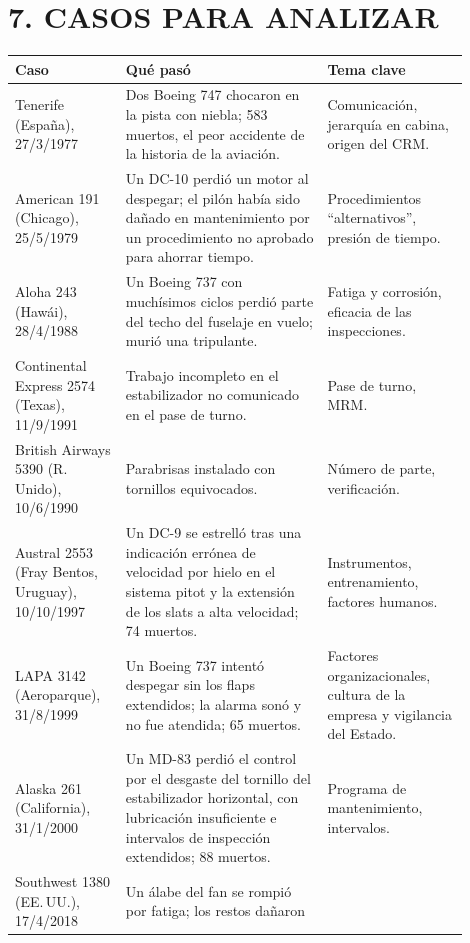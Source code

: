 \section*{7. CASOS PARA ANALIZAR}

\begin{center}
\footnotesize
\begin{tabular}{|p{0.22\linewidth}|p{0.40\linewidth}|p{0.28\linewidth}|}
\hline
\textbf{Caso} & \textbf{Qué pasó} & \textbf{Tema clave} \\ \hline
Tenerife (España), 27/3/1977 & Dos Boeing 747 chocaron en la pista con niebla; 583 muertos, el
peor accidente de la historia de la aviación. & Comunicación, jerarquía en cabina, origen del
CRM. \\ \hline
American 191 (Chicago), 25/5/1979 & Un DC-10 perdió un motor al despegar; el pilón había sido
dañado en mantenimiento por un procedimiento no aprobado para ahorrar tiempo. & Procedimientos
``alternativos'', presión de tiempo. \\ \hline
Aloha 243 (Hawái), 28/4/1988 & Un Boeing 737 con muchísimos ciclos perdió parte del techo del
fuselaje en vuelo; murió una tripulante. & Fatiga y corrosión, eficacia de las inspecciones. \\
\hline
Continental Express 2574 (Texas), 11/9/1991 & Trabajo incompleto en el estabilizador no
comunicado en el pase de turno. & Pase de turno, MRM. \\ \hline
British Airways 5390 (R. Unido), 10/6/1990 & Parabrisas instalado con tornillos equivocados. &
Número de parte, verificación. \\ \hline
Austral 2553 (Fray Bentos, Uruguay), 10/10/1997 & Un DC-9 se estrelló tras una indicación
errónea de velocidad por hielo en el sistema pitot y la extensión de los slats a alta velocidad;
74 muertos. & Instrumentos, entrenamiento, factores humanos. \\ \hline
LAPA 3142 (Aeroparque), 31/8/1999 & Un Boeing 737 intentó despegar sin los flaps extendidos; la
alarma sonó y no fue atendida; 65 muertos. & Factores organizacionales, cultura de la empresa
y vigilancia del Estado. \\ \hline
Alaska 261 (California), 31/1/2000 & Un MD-83 perdió el control por el desgaste del tornillo
del estabilizador horizontal, con lubricación insuficiente e intervalos de inspección
extendidos; 88 muertos. & Programa de mantenimiento, intervalos. \\ \hline
Southwest 1380 (EE.\,UU.), 17/4/2018 & Un álabe del fan se rompió por fatiga; los restos dañaron

\end{tabular}
\end{center}
